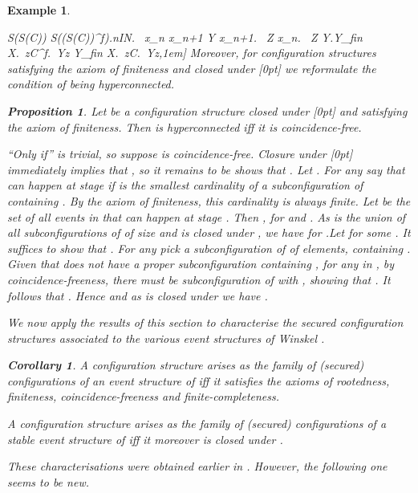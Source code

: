 \documentclass[twocolumn]{article}
\newtheorem{prop}{Proposition}[section]
\newtheorem{coro}{Corollary}
\newtheorem{exam}{Example}
\newenvironment{proposition}[1]{\begin{prop} \rm \label{pr-#1} }{\end{prop}}
\newenvironment{corollary}[1]{\begin{coro} \rm \label{cor-#1} }{\end{coro}}
\newenvironment{example}[1]{\begin{exam} \rm \label{ex-#1} }{\end{exam}}
\newenvironment{proof}{\begin{trivlist} \item[\hspace{\labelsep}\bf
Proof:]}{\hfill \end{trivlist}}
\newcommand{\turn}{\vdash}                              \newcommand{\dbigcup}{\bigcup_{\uparrow}}		\newcommand{\nbigcup}{\bigcup_{\bullet}}		\newcommand{\nbigcap}{\bigcap_{\bullet}}		\newcommand{\bbigcup}{\overline{\bigcup}}		\newcommand{\bbigcap}{\overline{\bigcap}}		\newcommand{\nbbigcap}{\bbigcap_{\bullet}}		\newcommand{\fbbigcup}{\overline{\bigcup}^f}		\newcommand{\bbbigcup}{\overline{\bigcup}^2}		\newcommand{\dcup}{~~\makebox[0pt]{\LARGE}\makebox[0pt]{}~~}
\newcommand{\dl}[1]{\mbox{\rm I\hspace{-0.75mm}#1}}     \newcommand{\dc}[1]{\mbox{\rm {\raisebox{.4ex}{\makebox [0pt][l]{\hspace{.2em}\scriptsize }}}#1}}
\newcommand{\IN}{\dl{N}}                        \newcommand{\IQ}{\dc{Q}}                        \newcommand{\IC}{\dc{C}}                        \newcommand{\IE}{\dl{E}}                        \newcommand{\IG}{\dc{G}}                        \newcommand{\fC}{{\cal C}}                      \newcommand{\fE}{{\cal E}}                      \newcommand{\fG}{{\cal G}}                      \newcommand{\fN}{{\cal N}}                      \newcommand{\fF}{{\cal F}}                      \newcommand{\fL}{{\cal L}}                      \newcommand{\fM}{{\cal M}}                      \newcommand{\fS}{{\cal S}}                      \newcommand{\fR}{{\cal R}}                      \newcommand{\eC}{{\rm C}}                       \newcommand{\eD}{{\rm D}}                       \newcommand{\eE}{{\rm E}}                       \newcommand{\eF}{{\rm F}}                       \newcommand{\eG}{{\rm G}}                       \newcommand{\eH}{{\rm H}}                       \newcommand{\eK}{{\rm K}}                       \newcommand{\eL}{{\rm L}}                       \newcommand{\eN}{{\rm N}}                       \newcommand{\eP}{{\rm P}}                       \newcommand{\eM}{{\rm M}}                       \newcommand{\eT}{{\rm T}}                       \newcommand{\fT}{{\cal T}}
\begin{document}
\begin{example}{causality}
\begin{proof}
S(\fS(\eC)) \hspace{-.55pt}\subseteq\hspace{-.55pt} S((\fS(\eC))^f).\forall n\in \IN.~ x_n \subseteq x_{n+1} \wedge \forall Y \subseteq
x_{n+1}.~ \exists Z \subseteq x_{n}.~ Z \turn Y.\forall Y\!\subseteq_{\it fin}\! X.~\exists z\!\in\!C^f\!\!.~Y\!\subseteq\!z
\Leftrightarrow
\forall Y\!\subseteq_{\it fin}\! X.~\exists z\!\in\!C.~Y\!\subseteq\!z,1em]
Moreover, for configuration structures satisfying the axiom of
finiteness and closed under \raisebox{-1.5pt}[0pt]{} we
reformulate the condition of being hyperconnected.

\begin{proposition}{coincidence-freeness-hyperconnectedness}
Let  be a configuration structure closed under
\raisebox{-1.5pt}[0pt]{} and satisfying the axiom of
finiteness.  Then  is hyperconnected iff it is coincidence-free.
\end{proposition}

\begin{proof}
``Only if'' is trivial, so suppose  is
coincidence-free. Closure under \raisebox{-2pt}[0pt]{}
immediately implies that , so it remains to be
shows that .  Let . For any  say
that  can happen at stage  if  is the smallest cardinality of
a subconfiguration of  containing . By the axiom of finiteness,
this cardinality is always finite. Let  be the set of all events
in  that can happen at stage . Then ,
 for  and .  As  is the union of all subconfigurations of  of
size  and  is closed under , we have
 for .\linebreak[3] Let  for some .  It suffices to show that
. For any \mbox{} pick a subconfiguration 
of  of  elements, containing .  Given that  does not
have a proper subconfiguration containing , for any  in
, by coincidence-freeness, there must be subconfiguration 
of  with , showing that . It follows that .  Hence  and as  is closed under \plat{\bbigcup}
we have .
\end{proof}
We now apply the results of this section to characterise the secured
configuration structures associated to the various event structures of
{\sc Winskel} \cite{Wi87a,Wi89}.

\begin{corollary}{characterisation-Wi87a}
A configuration structure arises as the family of (secured)
configurations of an event structure of \cite{Wi87a} iff it satisfies
the axioms of rootedness, finiteness, coincidence-freeness and
finite-completeness.

A configuration structure arises as the family of (secured)
configurations of a stable event structure of \cite{Wi87a} iff it
moreover is closed under .
\hfill 
\end{corollary}
These characterisations were obtained earlier in \cite{Wi87a}.
However, the following one seems to be new.


\end{proof}
\end{example}
\end{document}
